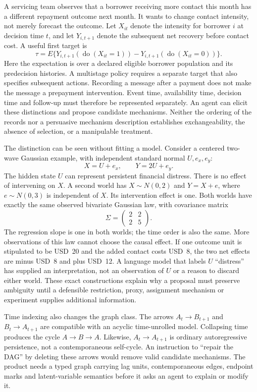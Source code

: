 A servicing team observes that a borrower receiving more contact this month
has a different repayment outcome next month. It wants to change contact
intensity, not merely forecast the outcome. Let $X_{it}$ denote the intensity
for borrower $i$ at decision time $t$, and let $Y_{i,t+1}$ denote the subsequent
net recovery before contact cost. A useful first target is
\[
 \tau=E\{Y_{i,t+1}(\operatorname{do}(X_{it}=1))
             -Y_{i,t+1}(\operatorname{do}(X_{it}=0))\}.
\]
Here the expectation is over a declared eligible borrower population and its
predecision histories. A multistage policy requires a separate target that
also specifies subsequent actions. Recording a message after a payment does
not make the message a prepayment intervention. Event time, availability time,
decision time and follow-up must therefore be represented separately. An agent
can elicit these distinctions and propose candidate mechanisms. Neither the
ordering of the records nor a persuasive mechanism description establishes
exchangeability, the absence of selection, or a manipulable treatment.
\citep{v12_la_2606_23608,exec15_latent_design}

The distinction can be seen without fitting a model. Consider a centered
two-wave Gaussian example, with independent standard normal $U,e_x,e_y$:
\[
 X=U+e_x,\qquad Y=2U+e_y.
\]
The hidden state $U$ can represent persistent financial distress. There is no
effect of intervening on $X$. A second world has $X\sim N(0,2)$ and
$Y=X+e$, where $e\sim N(0,3)$ is independent of $X$. Its intervention effect
is one. Both worlds have exactly the same observed bivariate Gaussian law,
with covariance matrix
\[
 \Sigma=\begin{pmatrix}2&2\\2&5\end{pmatrix}.
\]
The regression slope is one in both worlds; the time order is also the same.
More observations of this law cannot choose the causal effect. If one outcome
unit is stipulated to be USD~20 and the added contact costs USD~8, the two net
effects are minus USD~8 and plus USD~12. A language model that labels $U$
``distress'' has supplied an interpretation, not an observation of $U$ or a
reason to discard either world. These exact constructions explain why a
proposal must preserve ambiguity until a defensible restriction, proxy,
assignment mechanism or experiment supplies additional information.
\citep{exec15_latent_exact}

Time indexing also changes the graph class. The arrows
$A_t\to B_{t+1}$ and $B_t\to A_{t+1}$ are compatible with an acyclic
time-unrolled model. Collapsing time produces the cycle $A\to B\to A$.
Likewise, $A_t\to A_{t+1}$ is ordinary autoregressive persistence, not a
contemporaneous self-cycle. An instruction to ``repair the DAG'' by deleting
these arrows would remove valid candidate mechanisms. The product needs a
typed graph carrying lag units, contemporaneous edges, endpoint marks and
latent-variable semantics before it asks an agent to explain or modify it.
\citep{exec15_latent_exact,exec15_latent_design}


